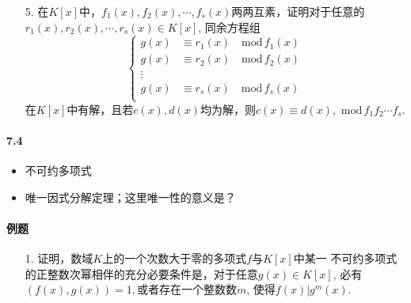 \begin{itemize}
    \item[5.] 在$K[x]$中，$f_1(x),f_2(x),\cdots,f_s(x)$两两互素，证明对于任意的
    $r_1(x),r_2(x),\cdots, r_s(x)\in K[x]$, 同余方程组
    \begin{equation}
    \nonumber
    \left\{
      \begin{aligned}
      g(x) &\equiv r_1(x) \quad \mathrm{mod}\, f_1(x)\\
      g(x) &\equiv r_2(x) \quad \mathrm{mod}\, f_2(x)\\
      \vdots&\\
      g(x) &\equiv r_s(x) \quad \mathrm{mod}\, f_s(x)\\
      \end{aligned}
    \right.
    \end{equation}
    在$K[x]$中有解，且若$c(x),d(x)$均为解，则$c(x) \equiv d(x),\,\,\mathrm{mod}\,f_1 f_2\cdots f_s$.
    \vspace{2cm}
\end{itemize}

\paragraph{7.4}
\begin{itemize}
  \item 不可约多项式
  \item 唯一因式分解定理；这里唯一性的意义是？
\end{itemize}
\paragraph{例题}
\begin{itemize}

\item[1.] 证明，数域$K$上的一个次数大于零的多项式$f$与$K[x]$中某一
不可约多项式的正整数次幂相伴的充分必要条件是，对于任意$g(x)\in K[x]$,
必有$(f(x), g(x)) = 1,$或者存在一个整数数$m$, 使得$f(x)|g^m(x)$.
\vspace{2cm}
\end{itemize}

